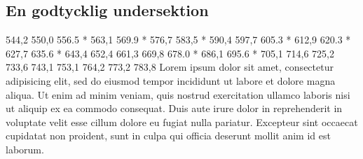 \documentclass[a4paper,10pt]{article}
\begin{document}
\subsection{En godtycklig undersektion} %

544,2
550,0
556.5 *
563,1
569.9 *
576,7
583,5 *
590,4
597,7
605.3 *
612,9
620.3 *
627,7
635.6 *
643,4
652,4
661,3
669,8
678.0 *
686,1
695.6 *
705,1
714,6
725,2
733,6
743,1
753,1
764,2
773,2
783,8
Lorem ipsum dolor sit amet, consectetur adipisicing elit, sed do eiusmod tempor incididunt ut labore et dolore magna aliqua. Ut enim ad minim veniam, quis nostrud exercitation ullamco laboris nisi ut aliquip ex ea commodo consequat. Duis aute irure dolor in reprehenderit in voluptate velit esse cillum dolore eu fugiat nulla pariatur. Excepteur sint occaecat cupidatat non proident, sunt in culpa qui officia deserunt mollit anim id est laborum.
\end{document}
